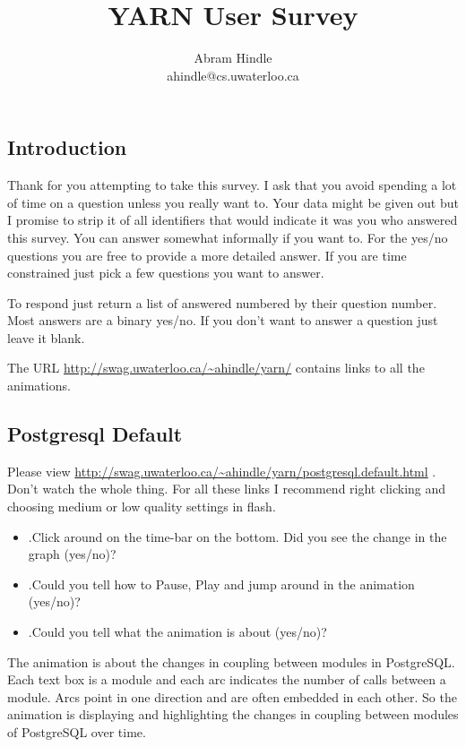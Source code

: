 \documentclass{article}
\title{YARN User Survey}
\author{Abram Hindle \\
ahindle@cs.uwaterloo.ca
}
\begin{document}
\setcounter{question}{0}
\newcommand{\quest}{\addtocounter{question}{1}\thequestion}
\newcommand{\qitem}{\item \quest.}

\maketitle

\subsection{Introduction}

Thank for you attempting to take this survey. I ask that you avoid
spending a lot of time on a question unless you really want to.  Your
data might be given out but I promise to strip it of all identifiers
that would indicate it was you who answered this survey.  You can
answer somewhat informally if you want to. For the yes/no questions
you are free to provide a more detailed answer. If you are time
constrained just pick a few questions you want to answer.

To respond just return a list of answered numbered by their question
number. Most answers are a binary yes/no. If you don't want to answer
a question just leave it blank.

The URL \url{http://swag.uwaterloo.ca/~ahindle/yarn/} contains links
to all the animations.

\subsection{Postgresql Default}

Please view
\url{http://swag.uwaterloo.ca/~ahindle/yarn/postgresql.default.html} .  Don't
watch the whole thing. For all these links I recommend right clicking
and choosing medium or low quality settings in flash.

\begin{itemize}
\qitem Click around on the time-bar on the bottom. Did you see the change in the graph (yes/no)?
\qitem Could you tell how to Pause, Play and jump around in the animation (yes/no)?
\qitem Could you tell what the animation is about (yes/no)?
\end{itemize}

The animation is about the changes in coupling between modules in
PostgreSQL. Each text box is a module and each arc indicates the
number of calls between a module. Arcs point in one direction and are
often embedded in each other. So the animation is displaying and
highlighting the changes in coupling between modules of PostgreSQL
over time.
\end{document}
